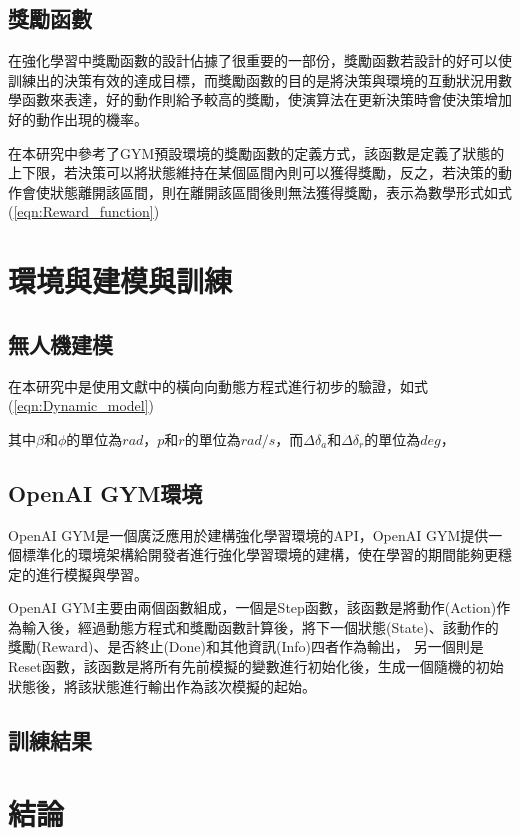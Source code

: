 \documentclass[a4paper, onecolumn, 11pt, AutoFakeBold]{article}
\newcommand{\texttwelve}{\fontsize{12}{12}\selectfont}
\renewcommand{\eqref}[1]{式(\ref{#1})}
\begin{document}
\begin{multicols*}{2}
\smallskip
\subsection{獎勵函數}
\par
在強化學習中獎勵函數的設計佔據了很重要的一部份，獎勵函數若設計的好可以使訓練出的決策有效的達成目標，而獎勵函數的目的是將決策與環境的互動狀況用數學函數來表達，好的動作則給予較高的獎勵，使演算法在更新決策時會使決策增加好的動作出現的機率。
\par
在本研究中參考了GYM預設環境的獎勵函數的定義方式，該函數是定義了狀態的上下限，若決策可以將狀態維持在某個區間內則可以獲得獎勵，反之，若決策的動作會使狀態離開該區間，則在離開該區間後則無法獲得獎勵，表示為數學形式如\eqref{eqn:Reward_function}

\noindent

\smallskip
\section{環境與建模與訓練}
\subsection{無人機建模}
在本研究中是使用文獻\cite{Optimal_Sliding_Mode_Controller_for_Fixed-wing_UAV}中的橫向向動態方程式進行初步的驗證，如\eqref{eqn:Dynamic_model}

\noindent 其中$\beta$和$\phi$的單位為$rad$，$p$和$r$的單位為$rad/s$，而$\Delta \delta_a$和$\Delta \delta_r$的單位為$deg$，

\subsection{OpenAI GYM環境}
\par
OpenAI GYM是一個廣泛應用於建構強化學習環境的API，OpenAI GYM提供一個標準化的環境架構給開發者進行強化學習環境的建構，使在學習的期間能夠更穩定的進行模擬與學習。
\par
OpenAI GYM主要由兩個函數組成，一個是Step函數，該函數是將動作(Action)作為輸入後，經過動態方程式和獎勵函數計算後，將下一個狀態(State)、該動作的獎勵(Reward)、是否終止(Done)和其他資訊(Info)四者作為輸出，
\noindent 另一個則是Reset函數，該函數是將所有先前模擬的變數進行初始化後，生成一個隨機的初始狀態後，將該狀態進行輸出作為該次模擬的起始。

\smallskip
\subsection{訓練結果}

\smallskip
\section{結論}

\smallskip
\titleformat{\section}{\bfseries\texttwelve}{}{0em}{}
\printbibliography[title={參考文獻}]

\end{multicols*}
\end{document}
